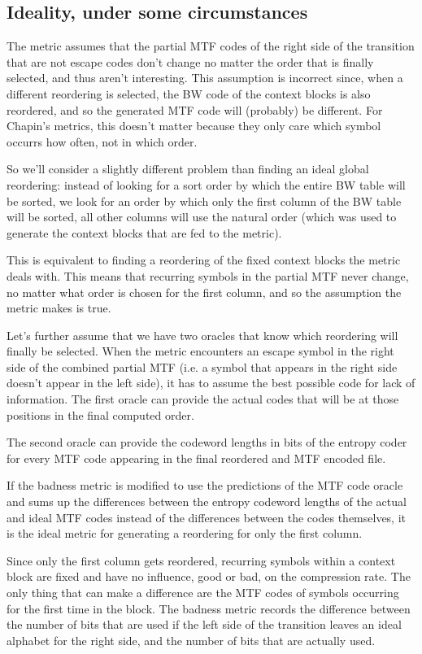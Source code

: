 \documentclass[a4paper]{scrreprt}
\begin{document}
\subsection{Ideality, under some circumstances}

The metric assumes that the partial MTF codes of the right side of the
transition that are not escape codes don't change no matter the order that is
finally selected, and thus aren't interesting. This assumption is incorrect
since, when a different reordering is selected, the BW code of the context
blocks is also reordered, and so the generated MTF code will (probably) be
different. For Chapin's metrics, this doesn't matter because they only care
which symbol occurrs how often, not in which order.

So we'll consider a slightly different problem than finding an ideal global
reordering: instead of looking for a sort order by which the entire BW table
will be sorted, we look for an order by which only the first column of the BW
table will be sorted, all other columns will use the natural order (which was
used to generate the context blocks that are fed to the metric).

This is equivalent to finding a reordering of the fixed context blocks the
metric deals with. This means that recurring symbols in the partial MTF never
change, no matter what order is chosen for the first column, and so the
assumption the metric makes is true.

Let's further assume that we have two oracles that know which reordering will
finally be selected. When the metric encounters an escape symbol in the right
side of the combined partial MTF (i.e. a symbol that appears in the right side
doesn't appear in the left side), it has to assume the best possible code for
lack of information. The first oracle can provide the actual codes that will be
at those positions in the final computed order.

The second oracle can provide the codeword lengths in bits of the entropy coder
for every MTF code appearing in the final reordered and MTF encoded file.

If the badness metric is modified to use the predictions of the MTF code oracle
and sums up the differences between the entropy codeword lengths of the actual
and ideal MTF codes instead of the differences between the codes themselves, it
is the ideal metric for generating a reordering for only the first column.

Since only the first column gets reordered, recurring symbols within a
context block are fixed and have no influence, good or bad, on the compression
rate. The only thing that can make a difference are the MTF codes of symbols
occurring for the first time in the block. The badness metric records the
difference between the number of bits that are used if the left side of the
transition leaves an ideal alphabet for the right side, and the number of bits
that are actually used.
\end{document}
